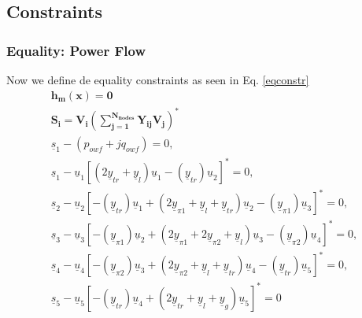 \documentclass[a4paper,11pt, titlepage, twoside]{article}
\begin{document}
\subsection{Constraints}
\subsubsection{Equality: Power Flow}

Now we define de equality constraints as seen in  Eq. \ref{eqconstr}
\begin{gather}
    \mathbf{h_m(x) = 0 } \label{eqconstr} \\
    \mathbf{S_i} = \mathbf{V_i(\sum_{j=1}^{N_{nodes}}Y_{ij}V_j)^*} \\
    \underline{s}_1-(p_{owf}+jq_{owf}) = 0, \nonumber \\
    \underline{s}_1-\underline{u}_1[(2\underline{y}_{tr}+\underline{y}_l)\underline{u}_1-(\underline{y}_{tr})\underline{u}_2]^* = 0, \nonumber \\
    \underline{s}_2-\underline{u}_2[-(\underline{y}_{tr})\underline{u}_1+(2\underline{y}_{\pi1}+\underline{y}_l+\underline{y}_{tr})\underline{u}_2-(\underline{y}_{\pi1})\underline{u}_3]^* = 0, \nonumber \\
    \underline{s}_3-\underline{u}_3[-(\underline{y}_{\pi1})\underline{u}_2+(2\underline{y}_{\pi1}+2\underline{y}_{\pi2}+\underline{y}_{l})\underline{u}_3-(\underline{y}_{\pi2})\underline{u}_4]^* = 0, \nonumber \\
    \underline{s}_4-\underline{u}_4[-(\underline{y}_{\pi2})\underline{u}_3+(2\underline{y}_{\pi2}+\underline{y}_l+\underline{y}_{tr})\underline{u}_4-(\underline{y}_{tr})\underline{u}_5]^* = 0, \nonumber \\
    \underline{s}_5-\underline{u}_5[-(\underline{y}_{tr})\underline{u}_4+(2\underline{y}_{tr}+\underline{y}_l+\underline{y}_{g})\underline{u}_5]^* = 0
\end{gather}

\newpage
\end{document}
